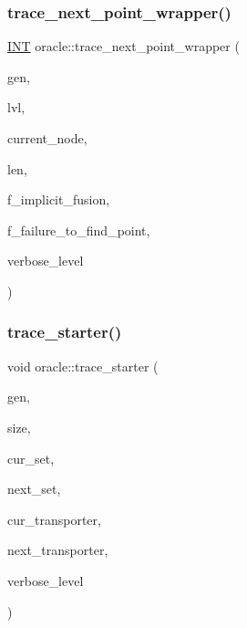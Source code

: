 \subsubsection{\texorpdfstring{trace\+\_\+next\+\_\+point\+\_\+wrapper()}{trace\_next\_point\_wrapper()}}
{\footnotesize\ttfamily \mbox{\hyperlink{galois_8h_a09fddde158a3a20bd2dcadb609de11dc}{I\+NT}} oracle\+::trace\+\_\+next\+\_\+point\+\_\+wrapper (\begin{DoxyParamCaption}\item[{\mbox{\hyperlink{classgenerator}{generator}} $\ast$}]{gen,  }\item[{\mbox{\hyperlink{galois_8h_a09fddde158a3a20bd2dcadb609de11dc}{I\+NT}}}]{lvl,  }\item[{\mbox{\hyperlink{galois_8h_a09fddde158a3a20bd2dcadb609de11dc}{I\+NT}}}]{current\+\_\+node,  }\item[{\mbox{\hyperlink{galois_8h_a09fddde158a3a20bd2dcadb609de11dc}{I\+NT}}}]{len,  }\item[{\mbox{\hyperlink{galois_8h_a09fddde158a3a20bd2dcadb609de11dc}{I\+NT}}}]{f\+\_\+implicit\+\_\+fusion,  }\item[{\mbox{\hyperlink{galois_8h_a09fddde158a3a20bd2dcadb609de11dc}{I\+NT}} \&}]{f\+\_\+failure\+\_\+to\+\_\+find\+\_\+point,  }\item[{\mbox{\hyperlink{galois_8h_a09fddde158a3a20bd2dcadb609de11dc}{I\+NT}}}]{verbose\+\_\+level }\end{DoxyParamCaption})}

\mbox{\label{classoracle_a1c0079d3860d8b80a918c3b37909fc35}} 
\subsubsection{\texorpdfstring{trace\+\_\+starter()}{trace\_starter()}}
{\footnotesize\ttfamily void oracle\+::trace\+\_\+starter (\begin{DoxyParamCaption}\item[{\mbox{\hyperlink{classgenerator}{generator}} $\ast$}]{gen,  }\item[{\mbox{\hyperlink{galois_8h_a09fddde158a3a20bd2dcadb609de11dc}{I\+NT}}}]{size,  }\item[{\mbox{\hyperlink{galois_8h_a09fddde158a3a20bd2dcadb609de11dc}{I\+NT}} $\ast$}]{cur\+\_\+set,  }\item[{\mbox{\hyperlink{galois_8h_a09fddde158a3a20bd2dcadb609de11dc}{I\+NT}} $\ast$}]{next\+\_\+set,  }\item[{\mbox{\hyperlink{galois_8h_a09fddde158a3a20bd2dcadb609de11dc}{I\+NT}} $\ast$}]{cur\+\_\+transporter,  }\item[{\mbox{\hyperlink{galois_8h_a09fddde158a3a20bd2dcadb609de11dc}{I\+NT}} $\ast$}]{next\+\_\+transporter,  }\item[{\mbox{\hyperlink{galois_8h_a09fddde158a3a20bd2dcadb609de11dc}{I\+NT}}}]{verbose\+\_\+level }\end{DoxyParamCaption})}

